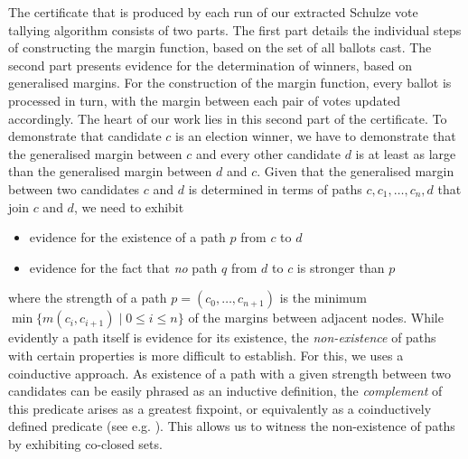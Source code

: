 The certificate that is produced by each run of our extracted Schulze vote
tallying algorithm  consists of two parts. The first part details
the individual steps of constructing the margin function, based on
the set of all ballots cast. The second part presents evidence for
the determination of winners, based on generalised margins. For the
construction of the margin function, every ballot is processed
in turn, with the margin between each pair of votes updated
accordingly.  The heart of our work lies in this second part of the
certificate. To demonstrate that candidate $c$ is an election
winner, we have to demonstrate that the generalised margin between
$c$ and every other candidate $d$ is at least as large than the
generalised margin  between $d$ and $c$. Given that the generalised margin
between two candidates $c$ and $d$ is determined in terms of
paths $c, c_1, \dots, c_n, d$ that join $c$
and $d$, we need to exhibit
\begin{itemize}
\item evidence for the existence of a path $p$ from $c$ to $d$
\item evidence for the fact that \emph{no} path $q$ from $d$ to $c$
is stronger than $p$
\end{itemize}
where the strength of a path $p = (c_0, \dots, c_{n+1})$ is the
minimum $\min \lbrace m(c_i, c_{i+1}) \mid 0 \leq i \leq n \rbrace$
of the margins between adjacent nodes.  While evidently a path
itself is evidence for its existence, the \emph{non-existence} of
paths with certain properties is more difficult to establish. For this,
we uses a coinductive approach. As existence of a path with a given
strength between two candidates can be easily phrased as an
inductive definition, the \emph{complement} of this predicate arises
as a greatest fixpoint, or equivalently as a coinductively defined
predicate (see e.g. \cite{Kozen:2016:PC}). This allows us to witness
the non-existence of paths by exhibiting co-closed sets.
  

